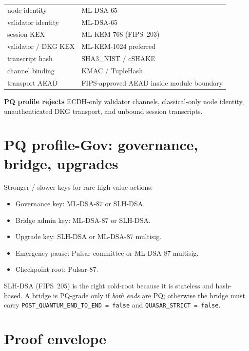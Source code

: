 \documentclass[11pt,a4paper]{article}
\newcommand{\PQ}{\textsf{PQ}}
\begin{document}
\begin{center}\small
\begin{tabular}{l l}
\toprule
node identity & ML-DSA-65 \\
validator identity & ML-DSA-65 \\
session KEX & ML-KEM-768 (FIPS~203) \\
validator / DKG KEX & ML-KEM-1024 preferred \\
transcript hash & SHA3\_NIST / cSHAKE \\
channel binding & KMAC / TupleHash \\
transport AEAD & FIPS-approved AEAD inside module boundary \\
\bottomrule
\end{tabular}
\end{center}

\textbf{PQ profile rejects} ECDH-only validator channels,
classical-only node identity, unauthenticated DKG transport, and
unbound session transcripts.

\section{PQ profile-Gov: governance, bridge, upgrades}
\label{sec:pq-gov}

Stronger / slower keys for rare high-value actions:

\begin{itemize}[leftmargin=*, itemsep=0pt]
\item Governance key: ML-DSA-87 or SLH-DSA.
\item Bridge admin key: ML-DSA-87 or SLH-DSA.
\item Upgrade key: SLH-DSA or ML-DSA-87 multisig.
\item Emergency pause: Pulsar committee or ML-DSA-87 multisig.
\item Checkpoint root: Pulsar-87.
\end{itemize}

\noindent
SLH-DSA (FIPS~205) is the right cold-root because it is stateless
and hash-based. A bridge is \PQ{}-grade only if \emph{both
ends} are \PQ{}; otherwise the bridge must carry
\texttt{POST\_QUANTUM\_END\_TO\_END = false} and
\texttt{QUASAR\_STRICT = false}.

\section{Proof envelope}
\label{sec:proof-envelope}
\end{document}
